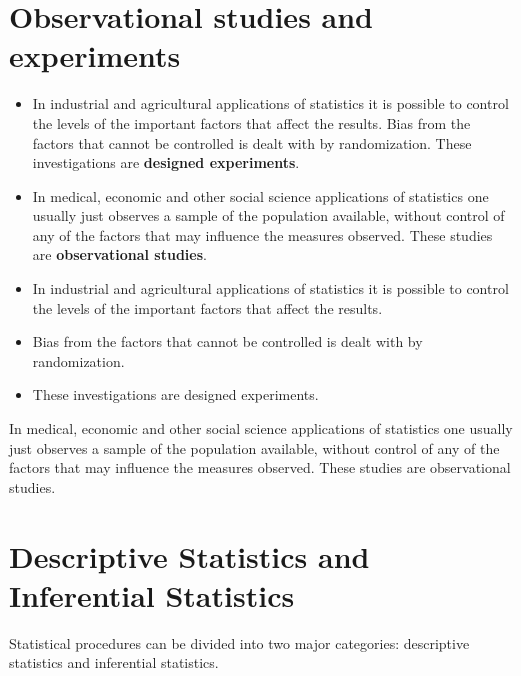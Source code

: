 \documentclass[]{report}
\begin{document}


\section{Observational studies and experiments}

\begin{itemize}
	\item In industrial and agricultural applications of statistics it is possible to control the
	levels of the important factors that affect the results. Bias from the factors that cannot
	be controlled is dealt with by randomization. These investigations are \textbf{designed
		experiments}. 
	
	\item In medical, economic and other social science applications of statistics
	one usually just observes a sample of the population available, without control of any
	of the factors that may influence the measures observed. These studies are
	\textbf{observational studies}.
\end{itemize}
\begin{itemize}
	\item In industrial and agricultural applications of statistics it is possible to control the
	levels of the important factors that affect the results. \item  Bias from the factors that cannot
	be controlled is dealt with by randomization. \item These investigations are designed
	experiments. 
\end{itemize}

In medical, economic and other social science applications of statistics
one usually just observes a sample of the population available, without control of any
of the factors that may influence the measures observed. These studies are
observational studies.

\section{Descriptive Statistics and Inferential Statistics}


Statistical procedures can be divided into two major categories: descriptive statistics and inferential statistics.
\end{document}
